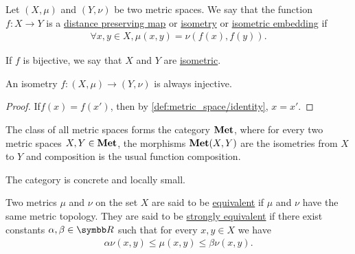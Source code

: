 \begin{definition}\label{def:isometry}\cite[253]{Engelking1989}
  Let $(X, \mu)$ and $(Y, \nu)$ be two metric spaces. We say that the function $f: X \to Y$ is a \ul{distance preserving map} or \ul{isometry} or \ul{isometric embedding} if
  \begin{align*}
    \forall x, y \in X, \mu(x, y) = \nu(f(x), f(y)).
  \end{align*}

  If $f$ is bijective, we say that $X$ and $Y$ are \ul{isometric}.
\end{definition}

\begin{proposition}\label{def:isometry_is_injective}
  An isometry $f: (X, \mu) \to (Y, \nu)$ is always injective.
\end{proposition}
\begin{proof}
  If\LEM $f(x) = f(x')$, then by \ref{def:metric_space/identity}, $x = x'$.
\end{proof}

\begin{definition}\label{def:category_of_metric_spaces}
  The class of all metric spaces forms the category $\operatorname{\mathbf{Met}}$, where for every two metric spaces $X, Y \in \operatorname{\mathbf{Met}}$, the morphisms $\operatorname{\mathbf{Met}}(X, Y)$ are the isometries from $X$ to $Y$ and composition is the usual function composition.

  The category is concrete and locally small.
\end{definition}

\begin{definition}\label{def:equivalent_metrics}
  Two metrics $\mu$ and $\nu$ on the set $X$ are said to be \ul{equivalent} if $\mu$ and $\nu$ have the same metric topology. They are said to be \ul{strongly equivalent} if there exist constants $\alpha, \beta \in \BB{R}$ such that for every $x, y \in X$ we have
  \begin{align*}
    \alpha \nu(x, y) \leq \mu(x, y) \leq \beta \nu(x, y).
  \end{align*}
\end{definition}

